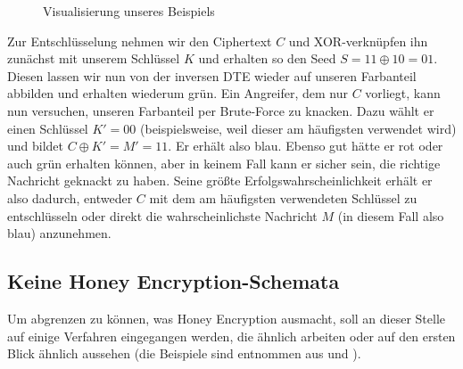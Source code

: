 \begin{figure}[!h]
\center
{}
\caption{Visualisierung unseres Beispiels}
\label{fig:Beispiel}
\end{figure}

Zur Entschlüsselung nehmen wir den Ciphertext \(C\) und XOR-verknüpfen ihn zunächst mit unserem Schlüssel \(K\) und erhalten so den Seed \(S = 11 \oplus 10 = 01\). Diesen lassen wir nun von der inversen DTE wieder auf unseren Farbanteil abbilden und erhalten wiederum grün. Ein Angreifer, dem nur \(C\) vorliegt, kann nun versuchen, unseren Farbanteil per Brute-Force zu knacken. Dazu wählt er einen Schlüssel \(K'=00\) (beispielsweise, weil dieser am häufigsten verwendet wird) und bildet \(C \oplus K' = M' = 11\). Er erhält also blau. Ebenso gut hätte er rot oder auch grün erhalten können, aber in keinem Fall kann er sicher sein, die richtige Nachricht geknackt zu haben. Seine größte Erfolgswahrscheinlichkeit erhält er also dadurch, entweder \(C\) mit dem am häufigsten verwendeten Schlüssel zu entschlüsseln oder direkt die wahrscheinlichste Nachricht \(M\) (in diesem Fall also blau) anzunehmen.

\subsection{Keine Honey Encryption-Schemata}

Um abgrenzen zu können, was Honey Encryption ausmacht, soll an dieser Stelle auf einige Verfahren eingegangen werden, die ähnlich arbeiten oder auf den ersten Blick ähnlich aussehen (die Beispiele sind entnommen aus \cite{EURO2014} und \cite{IEEE2014}).

